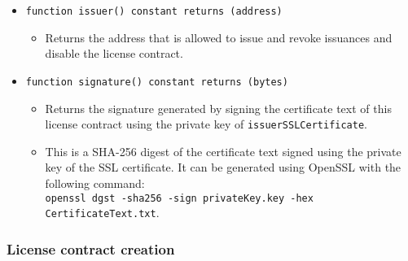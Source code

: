 \documentclass[a4paper]{article}
\begin{document}
\begin{itemize}
  \item \texttt{function issuer() constant returns (address)}
  \begin{itemize}
    \item Returns the address that is allowed to issue and revoke issuances and disable the license contract.
  \end{itemize}
  
  \item \texttt{function signature() constant returns (bytes)}
  \begin{itemize}
    \item Returns the signature generated by signing the certificate text of this license contract using the private key of \texttt{issuerSSLCertificate}.
    \item This is a SHA-256 digest of the certificate text signed using the private key of the SSL certificate. It can be generated using OpenSSL with the following command: \\\texttt{openssl dgst -sha256 -sign privateKey.key -hex CertificateText.txt}.
  \end{itemize}
\end{itemize}

\subsubsection{License contract creation}
\end{document}
